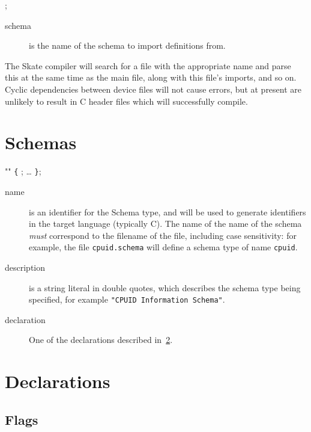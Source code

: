 \documentclass[a4paper,11pt,twoside]{report}
\begin{document}
{{\begin{syntax}
 ;
\end{syntax}

\begin{description}
\item[schema] is the name of the schema to import definitions from.  
\end{description}

The Skate compiler will search for a file with the appropriate name and
parse this at the same time as the main file, along with this file's
imports, and so on.  Cyclic dependencies between device files will not
cause errors, but at present are unlikely to result in C header files
which will successfully compile. 

\section{Schemas}\label{sec:decl:schema}

\begin{syntax}
  ""
\verb+{+
  ;
  \ldots
\verb+}+;
\end{syntax}

\begin{description}
\item[name] is an identifier for the Schema type, and will be used to
  generate identifiers in the target language (typically C).  
  The name of the name of the schema \emph{must} correspond to the
  filename of the file, including case sensitivity: for example, 
  the file \texttt{cpuid.schema} will define a schema type
  of name \texttt{cpuid}. 

\item [description] is a string literal in double quotes, which
  describes the schema type being specified, for example \texttt{"CPUID 
  Information Schema"}. 

\item [declaration] One of the declarations described in~\ref{sec:decl:decls}.

\end{description}

\section{Declarations}\label{sec:decl:decls}

\subsection{Flags}

}}
\end{document}
